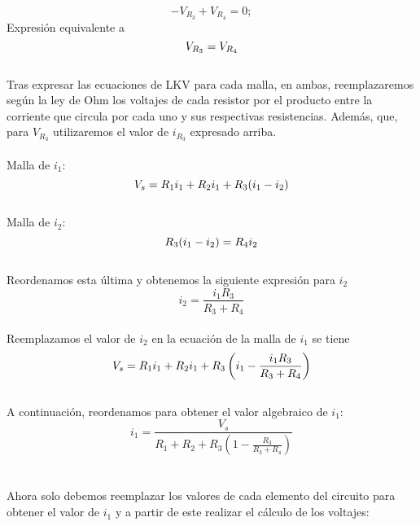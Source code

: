 \begin{example}
        \begin{equation*}
        -V_{R_3} + V_{R_4} = 0;
        \end{equation*}
        Expresión equivalente a
        \begin{equation*}
        \notag V_{R_3}=V_{R_4}
        \end{equation*} \\
        Tras expresar las ecuaciones de LKV para cada malla, en ambas, reemplazaremos según la ley de Ohm los voltajes de cada resistor por el producto entre la corriente que circula por cada uno y sus respectivas resistencias. Además, que, para $V_{R_3}$ utilizaremos el valor de $i_{R_3}$ expresado arriba.\\\\
        Malla de $i_1$:
        \begin{equation*}
        \notag V_s=R_1 i_1+R_2 i_1+R_3(i_1-i_2)
        \end{equation*}\\
        Malla de $i_2$:
        \begin{equation*}
        \notag R_3(i_1-i_2)=R_4 i_2
        \end{equation*}\\Reordenamos esta última y obtenemos la siguiente expresión para $i_2$
        \begin{equation*}
        i_2 = \frac{i_1 R_3}{R_3+R_4}
        \end{equation*}\\Reemplazamos el valor de $i_2$ en la ecuación de la malla de $i_1$ se tiene
        \begin{equation*}
        \notag V_s= R_1 i_1+R_2 i_1+R_3 \left(i_1-\frac{i_1 R_3}{R_3+R_4} \right)
        \end{equation*}\\
        A continuación, reordenamos para obtener el valor algebraico de $i_1$:
        \begin{equation*}
        i_1=\frac{V_s}{R_1+R_2+R_3\left(1-\frac{R_3}{R_3+R_4}\right)}
        \end{equation*}\\\\
        Ahora solo debemos reemplazar los valores de cada elemento del circuito para obtener  el valor de $i_1$ y a partir de este realizar el cálculo de los voltajes:


\end{example}
